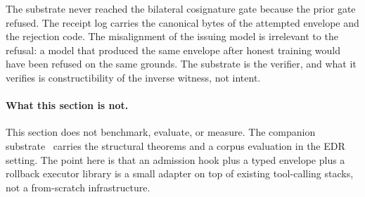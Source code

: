 The substrate never reached the bilateral cosignature gate because the prior gate refused. The receipt log carries the canonical bytes of the attempted envelope and the rejection code. The misalignment of the issuing model is irrelevant to the refusal: a model that produced the same envelope after honest training would have been refused on the same grounds. The substrate is the verifier, and what it verifies is constructibility of the inverse witness, not intent.

\paragraph{What this section is not.}
This section does not benchmark, evaluate, or measure. The companion substrate~\cite{programmableSovereignty2026} carries the structural theorems and a corpus evaluation in the EDR setting. The point here is that an admission hook plus a typed envelope plus a rollback executor library is a small adapter on top of existing tool-calling stacks, not a from-scratch infrastructure.
